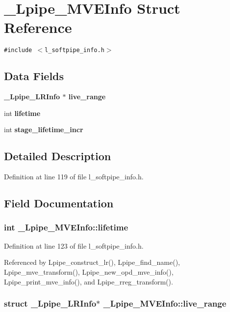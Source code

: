\section{\_\-Lpipe\_\-MVEInfo Struct Reference}
\label{struct__Lpipe__MVEInfo}
{\tt \#include $<$l\_\-softpipe\_\-info.h$>$}

\subsection*{Data Fields}
\begin{CompactItemize}
\item 
\bf{\_\-Lpipe\_\-LRInfo} $\ast$ \bf{live\_\-range}
\item 
int \bf{lifetime}
\item 
int \bf{stage\_\-lifetime\_\-incr}
\end{CompactItemize}


\subsection{Detailed Description}




Definition at line 119 of file l\_\-softpipe\_\-info.h.

\subsection{Field Documentation}
\subsubsection{\setlength{\rightskip}{0pt plus 5cm}int \bf{\_\-Lpipe\_\-MVEInfo::lifetime}}\label{struct__Lpipe__MVEInfo_f102af267f8a4b197c65664f8c3712c6}




Definition at line 123 of file l\_\-softpipe\_\-info.h.

Referenced by Lpipe\_\-construct\_\-lr(), Lpipe\_\-find\_\-name(), Lpipe\_\-mve\_\-transform(), Lpipe\_\-new\_\-opd\_\-mve\_\-info(), Lpipe\_\-print\_\-mve\_\-info(), and Lpipe\_\-rreg\_\-transform().
\subsubsection{\setlength{\rightskip}{0pt plus 5cm}struct \bf{\_\-Lpipe\_\-LRInfo}$\ast$ \bf{\_\-Lpipe\_\-MVEInfo::live\_\-range}}\label{struct__Lpipe__MVEInfo_fefeadc6c253fedb37efcb629620114b}




